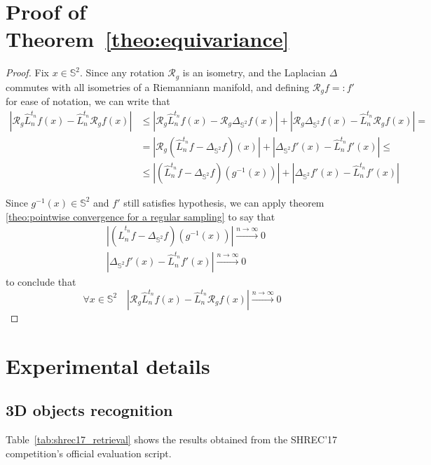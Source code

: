 \documentclass{article} %
\newcommand{\laplacian}{\Delta_{\mathbb S^2}}
\newcommand{\Rg}{\mathcal R_g}
\newcommand{\seminorm}[1]{\left|#1\right|}
\newcommand{\Ln}{\hat L_n^{t_n}}
\newcommand{\Tabref}[1]{Table~\ref{tab:#1}}
\begin{document}
\section{Proof of Theorem~\ref{theo:equivariance}}
\begin{proof}
Fix $x\in \mathbb S^2$. Since any rotation $\mathcal R_g$ is an isometry, and the Laplacian $\Delta$ commutes with all isometries of a Riemanniann manifold, and defining $\mathcal R_g f =: f'$ for ease of notation, we can write that
	\begin{align*}
			\seminorm{\Rg \Ln f (x) - \Ln \Rg f(x) } &\leq \seminorm{\Rg \Ln f (x) - \Rg \laplacian f(x)} + \seminorm{\Rg \laplacian f (x) - \Ln \Rg f(x)} =\\
			& =\seminorm{\Rg (\Ln f - \laplacian f ) (x)} + \seminorm{ \laplacian f' (x) - \Ln f'(x)} \leq \\
			& \leq \seminorm{(\Ln f - \laplacian f ) (g^{-1}(x))} + \seminorm{ \laplacian f' (x) - \Ln f'(x)}
	\end{align*}

Since $g^{-1}(x)\in\mathbb{S}^2$ and $f'$ still satisfies hypothesis, we can apply theorem \ref{theo:pointwise convergence for a regular sampling} to say that
\begin{align*}
 &\seminorm{(\Ln f - \laplacian f ) (g^{-1}(x))} \xrightarrow{n\to\infty}0\\
  &\seminorm{ \laplacian f' (x) - \Ln f'(x)}\xrightarrow{n\to\infty}0
\end{align*}
to conclude that $$\forall x\in\mathbb S^2 \quad\seminorm{\Rg \Ln f (x) - \Ln \Rg f(x) } \xrightarrow{n\to\infty}0$$

\end{proof}


\section{Experimental details}

\subsection{3D objects recognition}

\Tabref{shrec17_retrieval} shows the results obtained from the SHREC'17 competition's official evaluation script.
\end{document}

